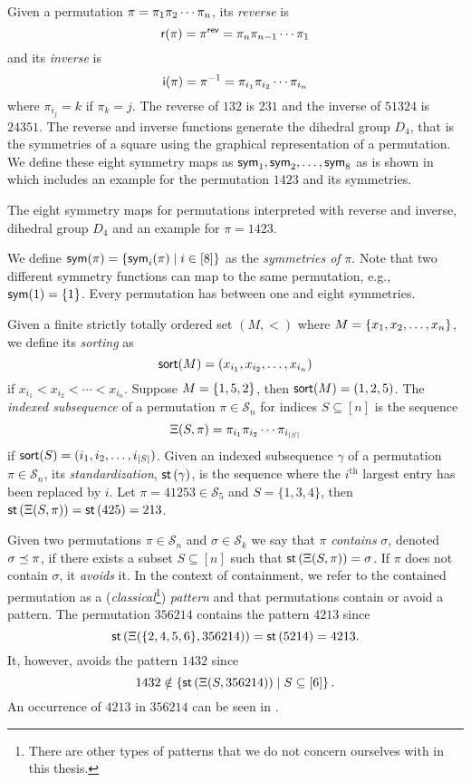 Given a permutation $\pi = \pi_1 \pi_2 \dotsm \pi_{n}$, its \emph{reverse} is
\[
    \textsf{r}(\pi) = \pi^\textsf{rev} = \pi_{n} \pi_{n - 1} \dotsm \pi_1
\]
and its \emph{inverse} is
\[
    \textsf{i}(\pi) = \pi^{-1} = \pi_{i_1} \pi_{i_2} \dotsm \pi_{i_{n}}
\]
where $\pi_{i_j} = k$ if $\pi_k = j$. The reverse of $132$ is $231$ and the inverse of $51324$ is $24351$. The reverse and inverse functions generate the dihedral group $D_4$, that is the symmetries of a square using the graphical representation of a permutation. We define these eight symmetry maps as $\textsf{sym}_1,\textsf{sym}_2,\dotsc,\textsf{sym}_8$ as is shown in  which includes an example for the permutation $1423$ and its symmetries.

\begin{table}[htbp]
    \centering
    
    \caption{The eight symmetry maps for permutations interpreted with reverse and inverse, dihedral group $D_4$ and an example for $\pi=1423$.}
    \label{tab:permsym}
\end{table}

We define $\textsf{sym}(\pi) = \left\{\textsf{sym}_i(\pi) \mid i \in [8]\right\}$ as the \emph{symmetries of} $\pi$. Note that two different symmetry functions can map to the same permutation, e.g., $\textsf{sym}(1) = \left\{1\right\}$. Every permutation has between one and eight symmetries.

Given a finite strictly totally ordered set $(M, <)$ where $M = \left\{x_1,x_2,\dotsc,x_n\right\}$, we define its \emph{sorting} as
\[
    \textsf{sort}(M) = (x_{i_1},x_{i_2},\dotsc,x_{i_n})
\]
if $x_{i_1} < x_{i_2} < \dotsm < x_{i_n}$. Suppose $M=\left\{1,5,2\right\}$, then $\textsf{sort}(M) = (1,2,5)$. The \emph{indexed subsequence} of a permutation $\pi \in \mathcal{S}_n$ for indices $S\subseteq [n]$ is the sequence
\[
    \Xi(S,\pi)=\pi_{i_1} \pi_{i_2} \dotsm \pi_{i_{|S|}}
\]
if $\textsf{sort}(S) = (i_1,i_2,\dotsc,i_{|S|})$. Given an indexed subsequence $\gamma$ of a permutation $\pi \in \mathcal{S}_n$, its \emph{standardization}, $\textsf{st}\left(\gamma\right)$, is the sequence where the $i^\text{th}$ largest entry has been replaced by $i$. Let $\pi = 41253 \in \mathcal{S}_5$ and $S=\{1,3,4\}$, then $\textsf{st}\left(\Xi(S,\pi)\right) = \textsf{st}\left(425\right) = 213$.

Given two permutations $\pi \in \mathcal{S}_n$ and $\sigma \in \mathcal{S}_k$ we say that $\pi$ \emph{contains} $\sigma$, denoted $\sigma \preceq \pi$, if there exists a subset $S \subseteq [n]$ such that $\textsf{st}\left(\Xi(S,\pi)\right) = \sigma$. If $\pi$ does not contain $\sigma$, it \emph{avoids} it. In the context of containment, we refer to the contained permutation as a (\emph{classical}\footnote{There are other types of patterns that we do not concern ourselves with in this thesis.}) \emph{pattern} and that permutations contain or avoid a pattern. The permutation $356214$ contains the pattern $4213$ since
\[
    \textsf{st}\left(\Xi(\{2, 4, 5, 6\},356214)\right) = \textsf{st}\left(5214\right) = 4213.
\]
It, however, avoids the pattern $1432$ since
\[
    1432 \notin \left\{\textsf{st}\left(\Xi(S,356214)\right) \mid S \subseteq [6]\right\}.
\]
An occurrence of $4213$ in $356214$ can be seen in .

